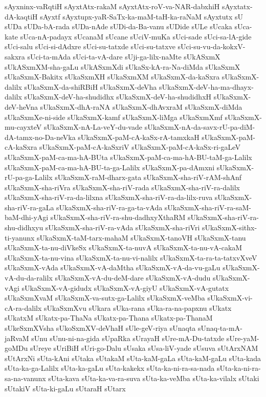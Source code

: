 {sAyxninx-vaRqtiH
sAyxtAtx-rakaM
sAyxtAtx-roV-va-NAR-dabxhiH
sAyxtatx-dA-kaqtiH
sAyxtf
sAyxtupx-yaR-SaTx-ka-maM-taH-ka-raNaM
sAyxtutx
sU
sUDa
sUDa-bA-rada
sUDa-nAde
sUDi-da-Ba-vanu
sUDide
sULe
sUcaka
sUca-kate
sUca-nA-padayx
sUcanaM
sUcane
sUciV-muKa
sUci-sade
sUci-sa-lA-gide
sUci-salu
sUci-si-dAdxre
sUci-su-tatxde
sUci-su-tatxve
sUci-su-vu-da-kokxV-sakxra
sUci-ta-mAda
sUci-ta-vA-dare
sUji-ga-lilx-naMte
sUkASxmX
sUkASxmXM-sha-gaLu
sUkASxmXdi
sUkaSx-kA-ra-Na-diMda
sUkaSxmX
sUkaSxmX-Bakitx
sUkaSxmXH
sUkaSxmXM
sUkaSxmX-da-kaSxra
sUkaSxmX-dalilx
sUkaSxmX-da-shiRBiH
sUkaSxmX-deVha
sUkaSxmX-deV-ha-ma-dhayx-dalilx
sUkaSxmX-deV-ha-shudidhx
sUkaSxmX-deV-ha-shudidhxH
sUkaSxmX-deV-heVna
sUkaSxmX-dhA-raNA
sUkaSxmX-dhAvxraM
sUkaSxmX-diMda
sUkaSxmXe-ni-side
sUkaSxmX-kamf
sUkaSxmX-liMga
sUkaSxmXmf
sUkaSxmX-mu-cayxteV
sUkaSxmX-nA-La-veY-du-vade
sUkaSxmX-nA-da-savx-rU-pa-diM-dA-tamx-no-Da-neVka
sUkaSxmX-paM-cA-kaSx-rA-tamxkaH
sUkaSxmX-paM-cA-kaSxra
sUkaSxmX-paM-cA-kaSxriV
sUkaSxmX-paM-cA-kaSx-ri-gaLeV
sUkaSxmX-paM-ca-ma-hA-BUta
sUkaSxmX-paM-ca-ma-hA-BU-taM-ga-Lalilx
sUkaSxmX-paM-ca-ma-hA-BU-ta-ga-Lalilx
sUkaSxmX-pa-dAmxni
sUkaSxmX-rU-pa-ga-Lalilx
sUkaSxmX-raM-dharx-gata
sUkaSxmX-sha-riV-rAM-shAnf
sUkaSxmX-sha-riVra
sUkaSxmX-sha-riV-rada
sUkaSxmX-sha-riV-ra-dalilx
sUkaSxmX-sha-riV-ra-da-lilxna
sUkaSxmX-sha-riV-ra-da-lilx-ruva
sUkaSxmX-sha-riV-ra-gaLa
sUkaSxmX-sha-riV-ra-ga-ta-vAda
sUkaSxmX-sha-riV-ra-saM-baM-dhi-yAgi
sUkaSxmX-sha-riV-ra-shu-dadhxyXthaRM
sUkaSxmX-sha-riV-ra-shu-didhxyu
sUkaSxmX-sha-riV-ra-vAda
sUkaSxmX-sha-riVri
sUkaSxmX-sithx-ti-yanunx
sUkaSxmX-taM-tarx-mahaM
sUkaSxmX-tanoVH
sUkaSxmX-tanu
sUkaSxmX-ta-nu-diVkeSx
sUkaSxmX-ta-nuvA
sUkaSxmX-ta-nu-vA-cakaM
sUkaSxmX-ta-nu-vina
sUkaSxmX-ta-nu-vi-nalilx
sUkaSxmX-ta-ra-ta-tatxvXveV
sUkaSxmX-vAda
sUkaSxmX-vA-daMtha
sUkaSxmX-vA-da-vu-gaLu
sUkaSxmX-vA-du-da-ralilx
sUkaSxmX-vA-du-deM-dare
sUkaSxmX-vA-dudu
sUkaSxmX-vAgi
sUkaSxmX-vA-gidudx
sUkaSxmX-vA-giyU
sUkaSxmX-vA-gutatx
sUkaSxmXvaM
sUkaSxmX-va-sutx-ga-Lalilx
sUkaSxmX-veMba
sUkaSxmX-vi-cA-ra-dalilx
sUkaSxmXvu
sUkara
sUka-rana
sUka-ra-na-papxnu
sUkatx
sUkatxM
sUkatx-pa-ThaNa
sUkatx-pa-Thana
sUkatx-pa-ThanaM
sUkeSxmXVsha
sUkoSxmXV-deVhaH
sUle-geV-riya
sUnaqta
sUnaq-ta-mA-jaRvaM
sUnu
sUnu-ni-na-gida
sUpaRka
sUrayaH
sUre-mA-Du-tatxde
sUre-yaM-goMDu
sUreye
sUriBiH
sUri-go-Dalu
sUsaka
sUsa-liV-yade
sUsuva
sUtArxNAM
sUtArxNi
sUta-kAni
sUtaka
sUtakaM
sUta-kaM-gaLa
sUta-kaM-gaLu
sUta-kada
sUta-ka-ga-Lalilx
sUta-ka-gaLu
sUta-kakekx
sUta-ka-ni-ra-sa-nada
sUta-ka-ni-ra-sa-na-vanunx
sUta-kava
sUta-ka-va-ra-suva
sUta-ka-veMba
sUta-ka-vilalx
sUtaki
sUtakiV
sUta-ki-gaLu
sUtaraH
sUtarx
}
